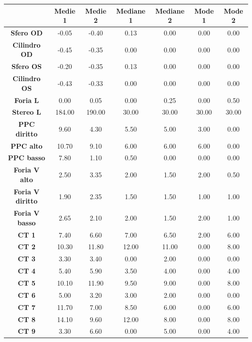 \begin{table}[H]
\begin{center}
\begin{tabular}{|c|c|c|c|c|c|c|} \hline
{\textbf{}} & {\textbf{Medie 1}} & {\textbf{Medie 2}}& {\textbf{Mediane 1}} & {\textbf{Mediane 2}} & {\textbf{Mode 1}} & {\textbf{Mode 2}}\\ \hline
\textbf{Sfero OD} & -0.05 & -0.40 & 0.13 & 0.00 & 0.00 & 0.00 \\ \hline
\textbf{Cilindro OD} & -0.45 & -0.35 & 0.00 & 0.00 & 0.00 & 0.00 \\ \hline
\textbf{Sfero OS} & -0.20 & -0.35 & 0.13 & 0.00 & 0.00 & 0.00 \\ \hline
\textbf{Cilindro OS} & -0.43 & -0.33 & 0.00 & 0.00 & 0.00 & 0.00 \\ \hline
\textbf{Foria L} & 0.00 & 0.05 & 0.00 & 0.25 & 0.00 & 0.50 \\ \hline
\textbf{Stereo L} & 184.00 & 190.00 & 30.00 & 30.00 & 30.00 & 30.00 \\ \hline
\textbf{PPC diritto} & 9.60 & 4.30 & 5.50 & 5.00 & 3.00 & 0.00 \\ \hline
\textbf{PPC alto} & 10.70 & 9.10 & 6.00 & 6.00 & 6.00 & 0.00\\ \hline
\textbf{PPC basso} & 7.80 & 1.10 & 0.50 & 0.00 & 0.00 & 0.00 \\ \hline
\textbf{Foria V alto} & 2.50 & 3.35 & 2.00 & 1.50 & 2.00 & 0.50 \\ \hline
\textbf{Foria V diritto} & 1.90 & 2.35 & 1.50 & 1.50 & 1.00 & 1.00 \\ \hline
\textbf{Foria V basso} & 2.65 & 2.10 & 2.00 & 1.50 & 2.00 & 1.00 \\ \hline
\textbf{CT 1} & 7.40 & 6.60 & 7.00 & 6.50 & 2.00 & 6.00 \\ \hline
\textbf{CT 2} & 10.30 & 11.80 & 12.00 & 11.00 & 0.00 & 8.00\\ \hline
\textbf{CT 3} & 3.30 & 3.40 & 0.00 & 2.00 & 0.00 & 0.00 \\ \hline
\textbf{CT 4} & 5.40 & 5.90 & 3.50 & 4.00 & 0.00 & 4.00 \\ \hline
\textbf{CT 5} & 10.10 & 11.90 & 9.50 & 9.00 & 0.00 & 8.00 \\ \hline
\textbf{CT 6} & 5.00 & 3.20 & 3.00 & 2.00 & 0.00 & 0.00 \\ \hline
\textbf{CT 7} & 11.70 & 7.00 & 8.50 & 6.00 & 0.00 & 6.00 \\ \hline
\textbf{CT 8} & 14.10 & 9.60 & 12.00 & 8.00 & 0.00 & 8.00 \\ \hline
\textbf{CT 9} & 3.30 & 6.60 & 0.00 & 5.00 & 0.00 & 4.00 \\ \hline

\end{tabular}
\end{center}
\end{table}
